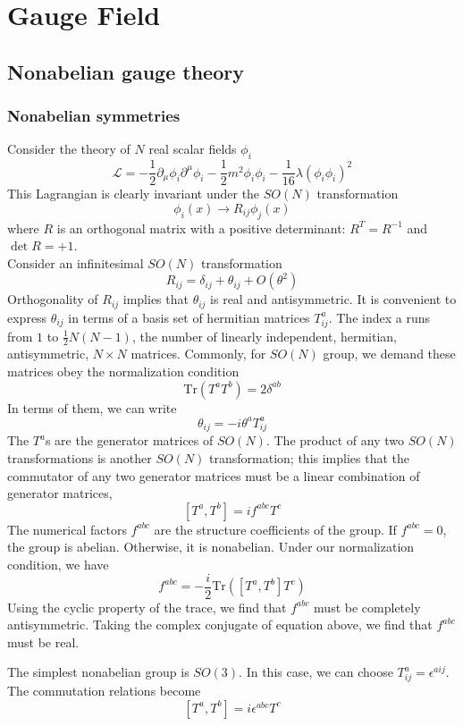 \chapter{Gauge Field}
\section{Nonabelian gauge theory}
\subsection{Nonabelian symmetries}
Consider the theory of $N$ real scalar fields $\phi_i$
\[\mathcal{L} = -\frac{1}{2}\partial_{\mu}\phi_i \partial^{\mu}\phi_i - \frac{1}{2}m^2\phi_i\phi_i - \frac{1}{16}\lambda(\phi_i\phi_i)^2\]
This Lagrangian is clearly invariant under the $SO(N)$ transformation
\[\phi_i(x) \to R_{ij}\phi_j(x)\]
where $R$ is an orthogonal matrix with a positive determinant: $R^T = R^{-1}$ and $\det R = +1$.
\\
Consider an infinitesimal $SO(N)$ transformation
\[R_{ij} = \delta_{ij} + \theta_{ij} + O(\theta^2)\]
Orthogonality of $R_{ij}$ implies that $\theta_{ij}$ is real and antisymmetric. It is convenient to express $\theta_{ij}$ in terms of a basis set of hermitian matrices $T^a_{ij}$. The index a runs from $1$ to $\frac{1}{2}N(N-1)$, the number of linearly independent, hermitian, antisymmetric, $N \times N$ matrices. Commonly, for $SO(N)$ group, we demand these matrices obey the normalization condition
\[\mathrm{Tr}(T^a T^b) = 2\delta^{ab}\]
In terms of them, we can write
\[\theta_{ij} = -i\theta^a T^a_{ij}\]
The $T^a$s are the generator matrices of $SO(N)$. The product of any two $SO(N)$ transformations is another $SO(N)$ transformation; this implies that the commutator of any two generator matrices must be a linear combination of generator matrices,
\[[T^a,T^b] = if^{abc}T^c\]
The numerical factors $f^{abc}$ are the structure coefficients of the group. If $f^{abc} = 0$, the group is abelian. Otherwise, it is nonabelian. Under our normalization condition, we have
\[f^{abc} = -\frac{i}{2} \mathrm{Tr} \left([T^a,T^b]T^c \right)\]
Using the cyclic property of the trace, we find that $f^{abc}$ must be completely antisymmetric. Taking the complex conjugate of equation above, we find that $f^{abc}$ must be real.

\begin{example}
The simplest nonabelian group is $SO(3)$. In this case, we can choose $T^a_{ij} = \epsilon^{aij}$. The commutation relations become
\[[T^a,T^b] = i\epsilon^{abc}T^c\]
\end{example}

